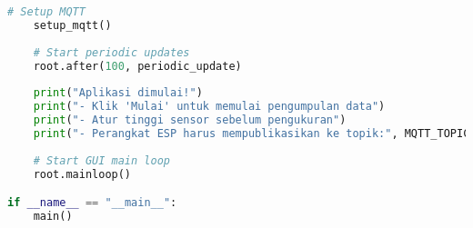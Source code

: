 \begin{itemize}
\begin{scriptsize}
\begin{lstlisting}[language=python]
    # Setup MQTT
    setup_mqtt()
    
    # Start periodic updates
    root.after(100, periodic_update)
    
    print("Aplikasi dimulai!")
    print("- Klik 'Mulai' untuk memulai pengumpulan data")
    print("- Atur tinggi sensor sebelum pengukuran")
    print("- Perangkat ESP harus mempublikasikan ke topik:", MQTT_TOPIC)
    
    # Start GUI main loop
    root.mainloop()

if __name__ == "__main__":
    main()
    \end{lstlisting}
    \end{scriptsize}
\end{itemize}
 